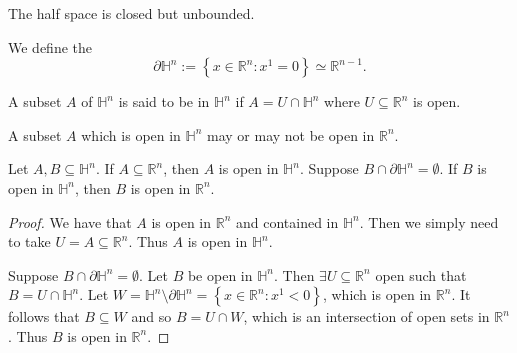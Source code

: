\documentclass[notoc,notitlepage]{tufte-book}
\begin{document}
\begin{note}
  The half space is closed but unbounded.
\end{note}

\begin{defn}\label{defn:boundary_of_the_half_space}
  We define the 
  \begin{equation*}
    \partial \mathbb{H}^n := \left\{ x \in \mathbb{R}^n : x^1 = 0 \right\}
    \simeq \mathbb{R}^{n - 1}.
  \end{equation*}
\end{defn}

\begin{defn}\label{defn:open_subset_in_a_half_space}
  A subset $A$ of $\mathbb{H}^n$ is said to be  in $\mathbb{H}^n$ if $A = U
  \cap \mathbb{H}^n$ where $U \subseteq \mathbb{R}^n$ is open.
\end{defn}

\begin{note}
  A subset $A$ which is open in $\mathbb{H}^n$ may or may not be open in
  $\mathbb{R}^n$.
\end{note}

\begin{lemma}\label{lemma:characterization_of_open_sets_in_a_half_space}
  Let $A, B \subseteq \mathbb{H}^n$. If $A \subseteq \mathbb{R}^n$, then $A$ is
  open in $\mathbb{H}^n$. Suppose $B \cap \partial \mathbb{H}^n = \emptyset$. If
  $B$ is open in $\mathbb{H}^n$, then $B$ is open in $\mathbb{R}^n$.
\end{lemma}

\begin{proof}
  We have that $A$ is open in $\mathbb{R}^n$ and contained in $\mathbb{H}^n$.
  Then we simply need to take $U = A \subseteq \mathbb{R}^n$. Thus $A$ is open
  in $\mathbb{H}^n$.

  Suppose $B \cap \partial \mathbb{H}^n = \emptyset$. Let $B$ be open in
  $\mathbb{H}^n$. Then $\exists U \subseteq \mathbb{R}^n$ open such that $B = U
  \cap \mathbb{H}^n$. Let $W = \mathbb{H}^n \setminus \partial \mathbb{H}^n =
  \left\{ x \in \mathbb{R}^n : x^1 < 0 \right\}$,
  which is open in $\mathbb{R}^n$. It follows that $B \subseteq W$ and so $B = U
  \cap W$, which is an intersection of open sets in $\mathbb{R}^n$. Thus $B$ is
  open in $\mathbb{R}^n$.
\end{proof}
\end{document}
